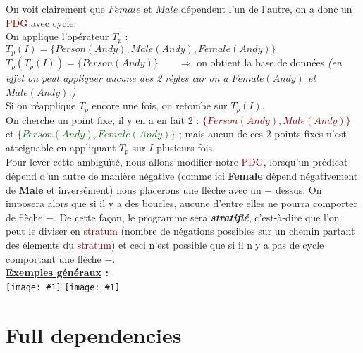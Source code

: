 \documentclass{article}
\newcommand{\gre}[1]{\textcolor{darkgreen}{#1}}
\newcommand{\red}[1]{\textcolor{darkred}{#1}}
\newcommand{\image}[1]{\texttt{[image: \#1]}}
\begin{document}
\noindent On voit clairement que $Female$ et $Male$ dépendent l'un de l'autre, on a donc un \red{PDG} avec cycle. \\
On applique l'opérateur $T_p$ :  \\
$T_p(I) = \{Person(Andy), Male(Andy), Female(Andy)\}$ \\
$T_p(T_p(I)) = \{Person(Andy)\}\qquad \Rightarrow$ on obtient la base de données \textit{(en effet on peut appliquer aucune des 2 règles car on a $Female(Andy)$ et 
$Male(Andy)$.)}  \\
Si on réapplique $T_p$ encore une fois, on retombe sur $T_p(I)$. \\
On cherche un point fixe, il y en a en fait 2 : \red{$\{Person(Andy), Male(Andy)\}$} et \gre{$\{Person(Andy), 
Female(Andy)\}$} ; mais aucun de ces 2 points fixes n'est atteignable en appliquant $T_p$ sur $I$ plusieurs fois. \\

Pour lever cette ambiguïté, nous allons modifier notre \red{PDG}, lorsqu'un prédicat dépend d'un autre de manière négative (comme ici \textbf{Female} dépend négativement de 
\textbf{Male} et inversément) nous placerons une flèche avec un $-$ dessus. On imposera alors que si il y a des boucles, aucune d'entre elles ne pourra comporter de flèche $-$. 
De cette façon, le programme sera \textit{\textbf{stratifié}}, c'est-à-dire que l'on peut le diviser en \red{stratum} (nombre de négations possibles sur un chemin partant des 
élements du \red{stratum}) et ceci n'est possible que si il n'y a pas de cycle comportant une flèche $-$. \\ $ $\\ 

\textbf{\underline{Exemples généraux} : } \\

\image{CAPT_005.png} \image{CAPT_006.png}

\section{Full dependencies}
\end{document}
